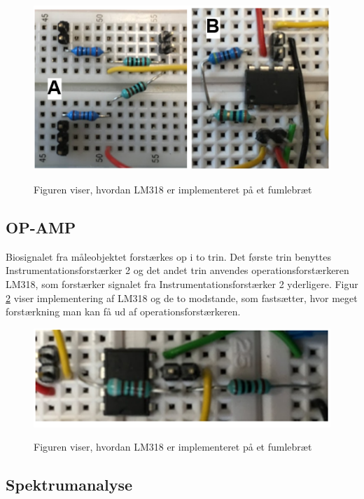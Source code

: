  

\begin{figure}[H] 
\centering
{\includegraphics[width=\linewidth]
{Figure/INA128ogSpDelerIM}}
\caption{Figuren viser, hvordan LM318 er implementeret på et fumlebræt  }
\label{figINAogSpandeler}
\end{figure}

\subsection{OP-AMP}

Biosignalet fra måleobjektet forstærkes op i to trin. Det første trin benyttes Instrumentationsforstærker 2 og det andet trin anvendes operationsforstærkeren LM318, som forstærker signalet fra Instrumentationsforstærker 2 yderligere. Figur \ref{opamp} viser implementering af LM318 og de to modstande, som fastsætter, hvor meget forstærkning man kan få ud af operationsforstærkeren. 



\begin{figure}[H] 
\centering
{\includegraphics[width=\linewidth]
{Figure/OP-AMPIM}}
\caption{Figuren viser, hvordan LM318 er implementeret på et fumlebræt  }
\label{opamp}
\end{figure}



    
\subsection{Spektrumanalyse}

